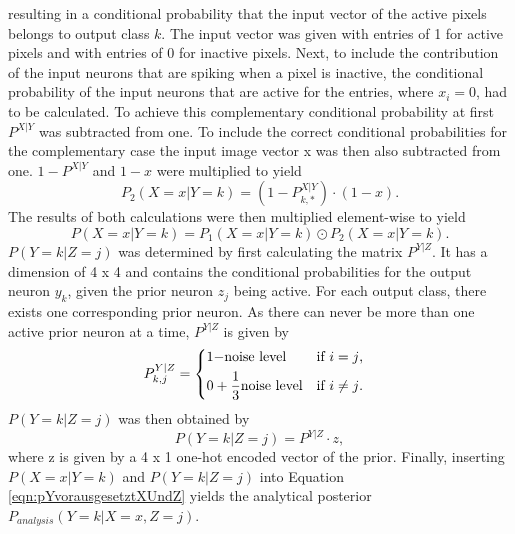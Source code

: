 resulting in a conditional probability that the input vector of the active pixels belongs to output class $k$. The input vector was given with entries of 1 for active pixels and with entries of 0 for inactive pixels.
Next, to include the contribution of the input neurons that are spiking when a pixel is inactive, the conditional probability of the input neurons that are active for the entries, where $x_i = 0$, had to be calculated. To achieve this complementary conditional probability at first $P^{X|Y}$ was subtracted from one. To include the correct conditional probabilities for the complementary case the input image vector x was then also subtracted from one. $1 - P^{X|Y}$ and $1 - x$ were multiplied to yield
\begin{equation}
\label{eqn:p2minusXvorausgesetztYMalX}
P_2(X = x|Y = k) = (1 - P^{X|Y}_{k,*}) \cdot (1 - x).
\end{equation}
The results of both calculations were then multiplied element-wise to yield
\begin{equation}
\label{eqn:pXvorausgesetztY}
P(X = x|Y = k) = P_1(X = x|Y = k) \odot P_2(X = x|Y = k).
\end{equation}
$P(Y=k|Z=j)$ was determined by first calculating the matrix $P^{Y|Z}$. It has a dimension of 4 x 4 and contains the conditional probabilities for the output neuron $y_k$, given the prior neuron $z_j$ being active. For each output class, there exists one corresponding prior neuron. As there can never be more than one active prior neuron at a time, $P^{Y|Z}$ is given by
\begin{equation}
\label{eqn:PYvorausgesetztZIf}
P_{k,j}^{Y|Z} = \begin{dcases*} 1 - $noise level$ & if $i = j$, \\
0 +  \frac{1}{3}  $noise level$ & \text{if $i \neq j$. } \end{dcases*}\end{equation} 
$P(Y=k|Z=j)$ was then obtained by
\begin{equation}
\label{eqn:pYvorausgesetztZ}
P(Y=k|Z=j) = P^{Y|Z} \cdot z,
\end{equation}
where z is given by a 4 x 1 one-hot encoded vector of the prior.
Finally, inserting $P(X = x|Y = k)$ and $P(Y=k|Z=j)$ into Equation \ref{eqn:pYvorausgesetztXUndZ} yields the analytical posterior $P_{analysis}(Y = k|X = x, Z = j)$.

